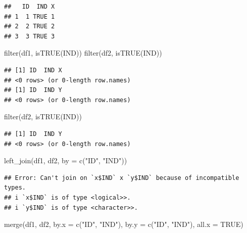 \documentclass[
]{krantz}
\makeatletter
\newenvironment{Shaded}{\begin{snugshade}}{\end{snugshade}}
\newcommand{\AttributeTok}[1]{\textcolor[rgb]{0.61,0.61,0.61}{#1}}
\newcommand{\ConstantTok}[1]{\textcolor[rgb]{0,0,0}{#1}}
\newcommand{\FunctionTok}[1]{\textcolor[rgb]{0,0,0}{#1}}
\newcommand{\NormalTok}[1]{#1}
\newcommand{\StringTok}[1]{\textcolor[rgb]{0.5,0.5,0.5}{#1}}
\newenvironment{kframe}{%
\medskip{}
\setlength{\fboxsep}{.8em}
 \def\at@end@of@kframe{}%
 \ifinner\ifhmode%
  \def\at@end@of@kframe{\end{minipage}}%
  \begin{minipage}{\columnwidth}%
 \fi\fi%
 \def\FrameCommand##1{\hskip\@totalleftmargin \hskip-\fboxsep
 \colorbox{shadecolor}{##1}\hskip-\fboxsep
     \hskip-\linewidth \hskip-\@totalleftmargin \hskip\columnwidth}%
 \MakeFramed {\advance\hsize-\width
   \@totalleftmargin\z@ \linewidth\hsize
   \@setminipage}}%
 {\par\unskip\endMakeFramed%
 \at@end@of@kframe}
\renewenvironment{Shaded}{\begin{kframe}}{\end{kframe}}
\makeatother
\begin{document}
\begin{verbatim}
##   ID  IND X
## 1  1 TRUE 1
## 2  2 TRUE 2
## 3  3 TRUE 3
\end{verbatim}

\begin{Shaded}
\begin{Highlighting}[]
\FunctionTok{filter}\NormalTok{(df1, }\FunctionTok{isTRUE}\NormalTok{(IND))}
\FunctionTok{filter}\NormalTok{(df2, }\FunctionTok{isTRUE}\NormalTok{(IND))}
\end{Highlighting}
\end{Shaded}

\begin{verbatim}
## [1] ID  IND X  
## <0 rows> (or 0-length row.names)
## [1] ID  IND Y  
## <0 rows> (or 0-length row.names)
\end{verbatim}

\begin{Shaded}
\begin{Highlighting}[]
\FunctionTok{filter}\NormalTok{(df2, }\FunctionTok{isTRUE}\NormalTok{(IND))}
\end{Highlighting}
\end{Shaded}

\begin{verbatim}
## [1] ID  IND Y  
## <0 rows> (or 0-length row.names)
\end{verbatim}

\begin{Shaded}
\begin{Highlighting}[]
\FunctionTok{left\_join}\NormalTok{(df1, df2, }\AttributeTok{by =} \FunctionTok{c}\NormalTok{(}\StringTok{"ID"}\NormalTok{, }\StringTok{"IND"}\NormalTok{))}
\end{Highlighting}
\end{Shaded}

\begin{verbatim}
## Error: Can't join on `x$IND` x `y$IND` because of incompatible types.
## i `x$IND` is of type <logical>>.
## i `y$IND` is of type <character>>.
\end{verbatim}

\begin{Shaded}
\begin{Highlighting}[]
\FunctionTok{merge}\NormalTok{(df1, df2, }\AttributeTok{by.x =} \FunctionTok{c}\NormalTok{(}\StringTok{"ID"}\NormalTok{, }\StringTok{"IND"}\NormalTok{), }\AttributeTok{by.y =} \FunctionTok{c}\NormalTok{(}\StringTok{"ID"}\NormalTok{, }\StringTok{"IND"}\NormalTok{), }\AttributeTok{all.x =} \ConstantTok{TRUE}\NormalTok{)}
\end{Highlighting}
\end{Shaded}
\end{document}
